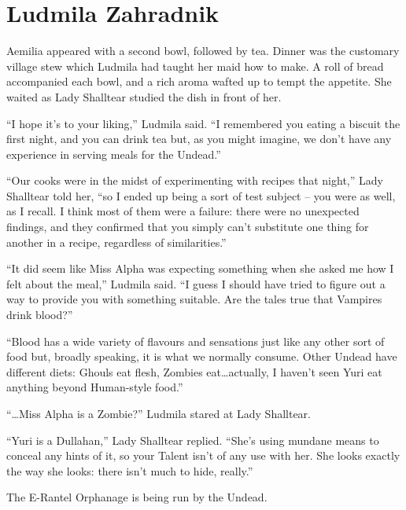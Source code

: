 \chapter{Ludmila Zahradnik}

Aemilia appeared with a second bowl, followed by tea. Dinner was the customary village stew which Ludmila had taught her maid how to make. A roll of bread accompanied each bowl, and a rich aroma wafted up to tempt the appetite. She waited as Lady Shalltear studied the dish in front of her.

 

“I hope it’s to your liking,” Ludmila said. “I remembered you eating a biscuit the first night, and you can drink tea but, as you might imagine, we don’t have any experience in serving meals for the Undead.”

 

“Our cooks were in the midst of experimenting with recipes that night,” Lady Shalltear told her, “so I ended up being a sort of test subject – you were as well, as I recall. I think most of them were a failure: there were no unexpected findings, and they confirmed that you simply can’t substitute one thing for another in a recipe, regardless of similarities.”

 

“It did seem like Miss Alpha was expecting something when she asked me how I felt about the meal,” Ludmila said. “I guess I should have tried to figure out a way to provide you with something suitable. Are the tales true that Vampires drink blood?”

 

“Blood has a wide variety of flavours and sensations just like any other sort of food but, broadly speaking, it is what we normally consume. Other Undead have different diets: Ghouls eat flesh, Zombies eat…actually, I haven’t seen Yuri eat anything beyond Human-style food.”

 

“…Miss Alpha is a Zombie?” Ludmila stared at Lady Shalltear.

 

“Yuri is a Dullahan,” Lady Shalltear replied. “She’s using mundane means to conceal any hints of it, so your Talent isn’t of any use with her. She looks exactly the way she looks: there isn’t much to hide, really.”

 

The E-Rantel Orphanage is being run by the Undead.

 


